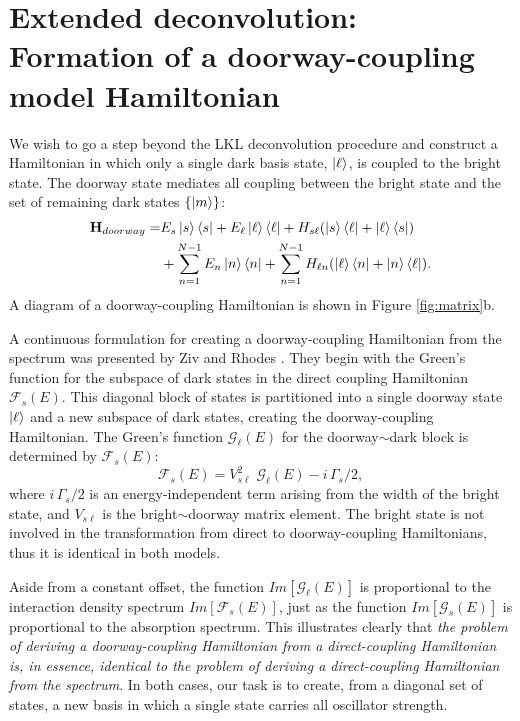 \documentclass[12pt]{mitthesis}
\begin{document}
\section{Extended deconvolution: \\
  Formation of a doorway-coupling model Hamiltonian}

We wish to go a step beyond the LKL deconvolution procedure and
construct a Hamiltonian in which only a single dark basis state,
$\mathinner{|{\ell}\rangle}$, is coupled to the bright state.  The doorway state
mediates all coupling between the bright state and the set of
remaining dark states $\lbrace \mathinner{|{m}\rangle} \rbrace$:
\begin{equation}
  \begin{split}
    \mathbf{H}_{doorway} =&
    E_s\mathinner{|{s}\rangle}\mathinner{\langle{s}|}
    + E_{\ell}\mathinner{|{\ell}\rangle}\mathinner{\langle{\ell}|}
    + H_{s\ell} ( \mathinner{|{s}\rangle}\mathinner{\langle{\ell}|} + \mathinner{|{\ell}\rangle}\mathinner{\langle{s}|} ) \\
    & + \sum_{n=1}^{N-1} E_n\mathinner{|{n}\rangle}\mathinner{\langle{n}|}
    + \sum_{n=1}^{N-1} H_{\ell n} (\mathinner{|{\ell}\rangle}\mathinner{\langle{n}|} + \mathinner{|{n}\rangle}\mathinner{\langle{\ell}|}).
  \end{split}
\end{equation}
A diagram of a doorway-coupling Hamiltonian is shown in Figure
\ref{fig:matrix}b.

A continuous formulation for creating a doorway-coupling Hamiltonian
from the spectrum was presented by Ziv and Rhodes \cite{ziv76}.  They
begin with the Green's function for the subspace of dark states in the
direct coupling Hamiltonian $\mathcal{F}_s(E)$.  This diagonal block
of states is partitioned into a single doorway state $\mathinner{|{\ell}\rangle}$ and
a new subspace of dark states, creating the doorway-coupling
Hamiltonian.  The Green's function $\mathcal{G}_{\ell}(E)$ for the
doorway$\sim$dark block is determined by $\mathcal{F}_s(E)$:
\begin{equation}
  \label{eq:green-doorway}
  \mathcal{F}_s(E) = V_{s\ell}^2 \; \mathcal{G}_{\ell}(E) - i \, \Gamma_s / 2,
\end{equation}
where $i \, \Gamma_s / 2$ is an energy-independent term arising from
the width of the bright state, and $V_{s\ell}$ is the
bright$\sim$doorway matrix element.  The bright state is not
involved in the transformation from direct to doorway-coupling
Hamiltonians, thus it is identical in both models. 

Aside from a constant offset, the function $Im[\mathcal{G}_{\ell}(E)]$
is proportional to the interaction density spectrum
$Im[\mathcal{F}_s(E)]$, just as the function $Im[\mathcal{G}_s(E)]$ is
proportional to the absorption spectrum.  This illustrates clearly
that \emph{the problem of deriving a doorway-coupling Hamiltonian from
  a direct-coupling Hamiltonian is, in essence, identical to the
  problem of deriving a direct-coupling Hamiltonian from the
  spectrum}.  In both cases, our task is to create, from a diagonal
set of states, a new basis in which a single state carries all
oscillator strength.
\end{document}
